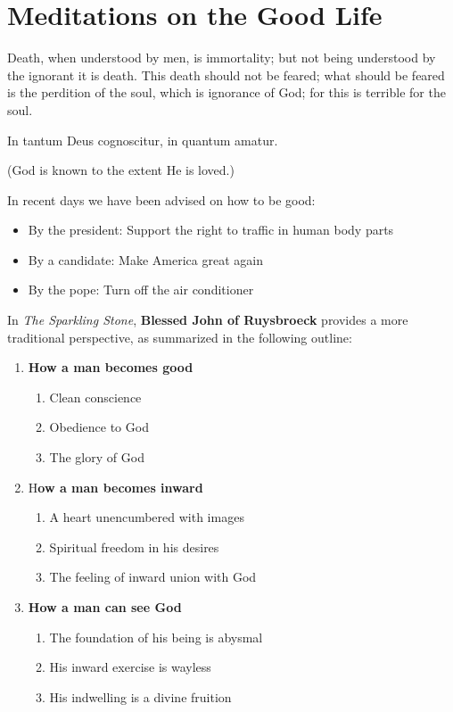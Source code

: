 \section{Meditations on the Good Life}

\begin{quotex}
Death, when understood by men, is immortality; but not being understood by the ignorant it is death. This death should not be feared; what should be feared is the perdition of the soul, which is ignorance of God; for this is terrible for the soul. 

In tantum Deus cognoscitur, in quantum amatur. 

(God is known to the extent He is loved.) 

\end{quotex}
In recent days we have been advised on how to be good:

\begin{itemize}
\item By the president: Support the right to traffic in human body parts 
\item By a candidate: Make America great again 
\item By the pope: Turn off the air conditioner 
\end{itemize}
In \emph{The Sparkling Stone}, \textbf{Blessed John of Ruysbroeck} provides a more traditional perspective, as summarized in the following outline:

\begin{enumerate}
\item \textbf{How a man becomes good} 

\begin{enumerate}
\item Clean conscience 
\item Obedience to God 
\item The glory of God 
\end{enumerate}
\item H\textbf{ow a man becomes inward} 

\begin{enumerate}
\item A heart unencumbered with images 
\item Spiritual freedom in his desires 
\item The feeling of inward union with God 
\end{enumerate}
\item \textbf{How a man can see God} 

\begin{enumerate}
\item The foundation of his being is abysmal 
\item His inward exercise is wayless 
\item His indwelling is a divine fruition 
\end{enumerate}
\end{enumerate}
